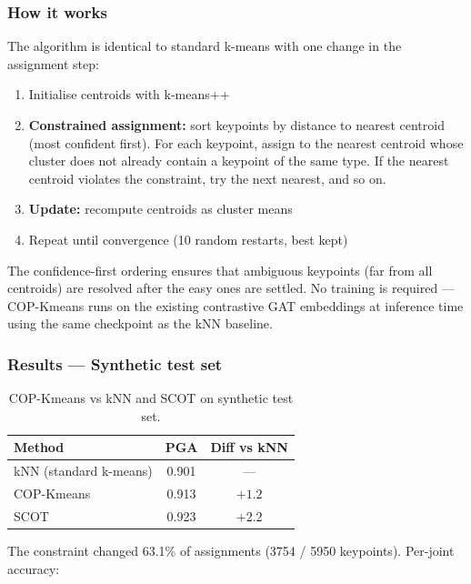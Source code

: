 \subsubsection{How it works}

The algorithm is identical to standard k-means with one change in the assignment step:

\begin{enumerate}
  \item Initialise centroids with k-means++
  \item \textbf{Constrained assignment:} sort keypoints by distance to nearest centroid (most confident first). For each keypoint, assign to the nearest centroid whose cluster does not already contain a keypoint of the same type. If the nearest centroid violates the constraint, try the next nearest, and so on.
  \item \textbf{Update:} recompute centroids as cluster means
  \item Repeat until convergence (10 random restarts, best kept)
\end{enumerate}

The confidence-first ordering ensures that ambiguous keypoints (far from all centroids) are resolved after the easy ones are settled. No training is required --- COP-Kmeans runs on the existing contrastive GAT embeddings at inference time using the same checkpoint as the kNN baseline.


\subsubsection{Results --- Synthetic test set}

\begin{table}[H]
\centering
\footnotesize
\begin{tabular}{lcc}
\toprule
Method & PGA & Diff vs kNN \\
\midrule
kNN (standard k-means) & 0.901 & --- \\
COP-Kmeans & 0.913 & $+1.2$ \\
SCOT & 0.923 & $+2.2$ \\
\bottomrule
\end{tabular}
\caption{COP-Kmeans vs kNN and SCOT on synthetic test set.}
\end{table}

The constraint changed 63.1\% of assignments (3754 / 5950 keypoints). Per-joint accuracy:

